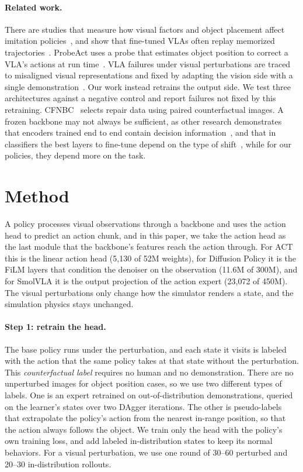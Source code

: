 \documentclass[10pt]{article}
\begin{document}
\paragraph{Related work.} There are studies that measure how visual factors and object placement affect
imitation policies~\citep{xie2024decomposing,xue2025demogen}, and show that fine-tuned VLAs often replay
memorized trajectories~\citep{zhou2025liberopro}. ProbeAct uses a probe that estimates object position to
correct a VLA's actions at run time~\citep{zhang2026probeact}. VLA failures under visual perturbations
are traced to misaligned visual representations and fixed by adapting the vision side with a single
demonstration~\citep{li2025vlagen}. Our work instead retrains the output side.
We test three architectures against a negative control and report failures not fixed by this retraining.
CFNBC~\citep{durso2026cfnbc} selects repair data using paired counterfactual images. A frozen backbone
may not always be sufficient, as other research demonstrates that encoders trained end to end contain
decision information~\citep{wang2024feature}, and that in classifiers the best layers to fine-tune depend
on the type of shift~\citep{lee2023surgical}, while for our policies, they depend more on the task.

\section{Method}
\label{sec:method}
A policy processes visual observations through a backbone and uses the action head to predict an action
chunk, and in this paper, we take the action head as the last module that the backbone's features reach the
action through. For ACT this is
the linear action head (5{,}130 of 52M weights), for Diffusion Policy it is the
FiLM layers that condition the denoiser on the observation (11.6M of 300M), and for SmolVLA it
is the output projection of the action expert (23{,}072 of 450M). The visual perturbations only change
how the simulator renders a state, and the simulation physics stays unchanged.

\paragraph{Step 1: retrain the head.} The base policy runs under the perturbation, and each state it
visits is labeled with the action that the same policy takes at that state without the perturbation.
This \emph{counterfactual label} requires no human and no demonstration. There are no unperturbed images
for object position cases, so we use two different types of labels. One is an expert retrained on
out-of-distribution demonstrations, queried on the learner's states over two DAgger iterations. The other
is pseudo-labels that extrapolate the policy's action from the nearest in-range position, so that the
action always follows the object. We train only the head with the policy's own training loss, and add
labeled in-distribution states to keep its normal behaviors. For a visual perturbation, we use one round
of 30--60 perturbed and 20--30 in-distribution rollouts.
\end{document}
